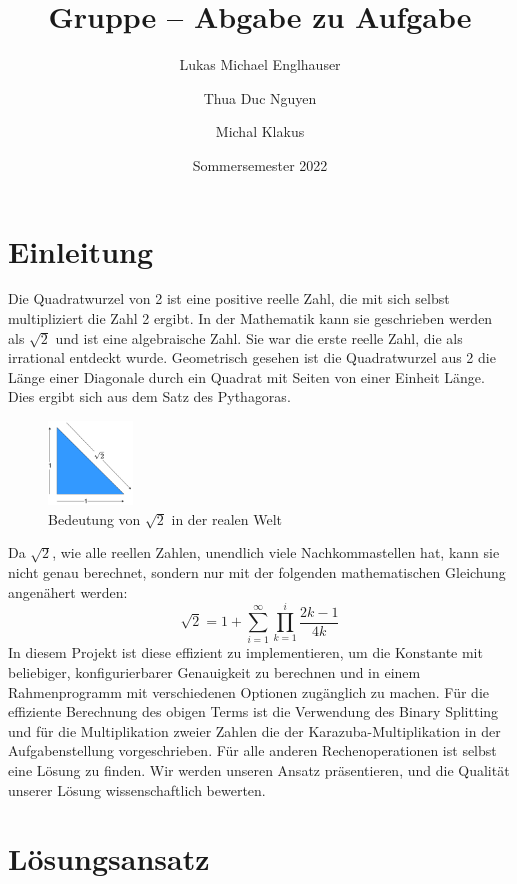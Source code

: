 \documentclass[course=erap]{aspdoc}
\author{Lukas Michael Englhauser \and Thua Duc Nguyen \and Michal Klakus}
\date{Sommersemester 2022} %
\title{Gruppe \theGroup{} -- Abgabe zu Aufgabe \theNumber}
\begin{document}
	\maketitle
	
	\section{Einleitung}
	
	Die Quadratwurzel von 2 ist eine positive reelle Zahl, 
	die mit sich selbst multipliziert die Zahl 2 ergibt. In der Mathematik 
	kann sie geschrieben werden als \(\sqrt{2}\) und ist eine 
	algebraische Zahl. Sie war die erste reelle Zahl, die als irrational entdeckt wurde.
	\newline
	Geometrisch gesehen ist die Quadratwurzel aus 2 die Länge einer Diagonale durch ein 
	Quadrat mit Seiten von einer Einheit Länge. Dies ergibt sich aus dem Satz des Pythagoras.
	\newline
	\begin{figure}[h]
		\centering
		\includegraphics[width=0.2\textwidth]{Abbildungen/triangle.png}
		\caption{Bedeutung von $\sqrt{2}$ in der realen Welt}
	\end{figure}
	\newline
	Da $\sqrt{2}$, wie alle reellen Zahlen, unendlich viele Nachkommastellen hat, kann sie nicht genau berechnet, sondern nur mit der folgenden mathematischen Gleichung angenähert werden:
	\begin{equation*}
		\sqrt{2} = 1 + \sum_{i=1}^{\infty} \prod_{k=1}^{i} \frac{2k-1}{4k}
	\end{equation*}
	In diesem Projekt ist diese effizient zu implementieren, um die Konstante mit beliebiger, konfigurierbarer Genauigkeit zu berechnen und in einem Rahmenprogramm mit verschiedenen Optionen zugänglich zu machen. Für die effiziente Berechnung des obigen Terms ist die Verwendung des Binary Splitting und für die Multiplikation zweier Zahlen die der Karazuba-Multiplikation in der Aufgabenstellung vorgeschrieben. Für alle anderen Rechenoperationen ist selbst eine Lösung zu finden.
	Wir werden unseren Ansatz präsentieren, und die Qualität
	unserer Lösung wissenschaftlich bewerten.\newpage
	
	\section{Lösungsansatz}
	
\end{document}
